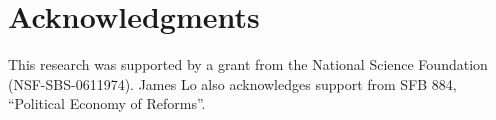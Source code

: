 \documentclass[nojss]{jss}
\begin{document}
\section{Acknowledgments}

This research was supported by a grant from the National Science Foundation (NSF-SBS-0611974). James Lo also acknowledges support from SFB 884, ``Political Economy of Reforms''.

\newpage


\end{document}
